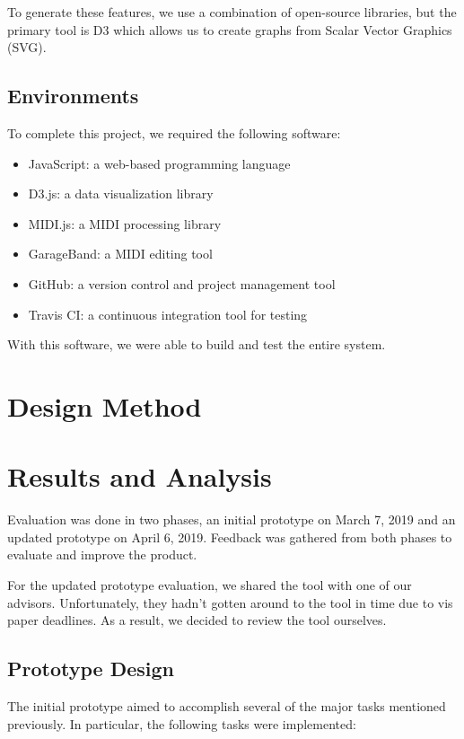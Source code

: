 \documentclass[journal]{vgtc}                %
\begin{document}
To generate these features, we use a combination of open-source libraries, but
the primary tool is D3 which allows us to create graphs from Scalar Vector
Graphics (SVG).

\subsection{Environments}

To complete this project, we required the following software:

\begin{itemize}
  \item JavaScript: a web-based programming language
  \item D3.js: a data visualization library
  \item MIDI.js: a MIDI processing library
  \item GarageBand: a MIDI editing tool
  \item GitHub: a version control and project management tool
  \item Travis CI: a continuous integration tool for testing
\end{itemize}

With this software, we were able to build and test the entire system.

\section{Design Method}

\section{Results and Analysis}

Evaluation was done in two phases, an initial prototype on March 7, 2019 and an
updated prototype on April 6, 2019. Feedback was gathered from both phases to
evaluate and improve the product.

For the updated prototype evaluation, we shared the tool with one of our advisors.
Unfortunately, they hadn’t gotten around to the tool in time due to vis paper
deadlines. As a result, we decided to review the tool ourselves.

\subsection{Prototype Design}

The initial prototype aimed to accomplish several of the major tasks mentioned
previously. In particular, the following tasks were implemented:
\end{document}
